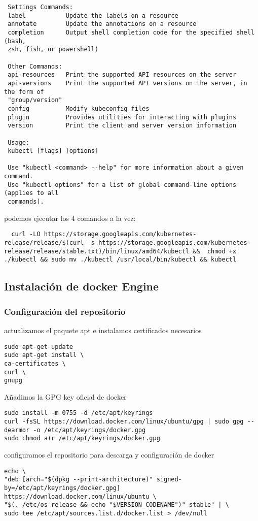 \documentclass[../main.tex]{subfiles}
\begin{document}
\begin{lstlisting}
 Settings Commands:
 label           Update the labels on a resource
 annotate        Update the annotations on a resource
 completion      Output shell completion code for the specified shell (bash,
 zsh, fish, or powershell)
 
 Other Commands:
 api-resources   Print the supported API resources on the server
 api-versions    Print the supported API versions on the server, in the form of
 "group/version"
 config          Modify kubeconfig files
 plugin          Provides utilities for interacting with plugins
 version         Print the client and server version information
 
 Usage:
 kubectl [flags] [options]
 
 Use "kubectl <command> --help" for more information about a given command.
 Use "kubectl options" for a list of global command-line options (applies to all
 commands).
 \end{lstlisting}
 
 podemos ejecutar los 4 comandos a la vez:
\begin{lstlisting} 
  curl -LO https://storage.googleapis.com/kubernetes-release/release/$(curl -s https://storage.googleapis.com/kubernetes-release/release/stable.txt)/bin/linux/amd64/kubectl &&  chmod +x ./kubectl && sudo mv ./kubectl /usr/local/bin/kubectl && kubectl
\end{lstlisting}
\subsection{Instalación de docker Engine}
\subsubsection{Configuración del repositorio} 
actualizamos el paquete apt e instalamos certificados necesarios
\begin{lstlisting} 
sudo apt-get update
sudo apt-get install \
ca-certificates \
curl \
gnupg
\end{lstlisting} 

Añadimos la GPG key oficial de docker
\begin{lstlisting}
sudo install -m 0755 -d /etc/apt/keyrings
curl -fsSL https://download.docker.com/linux/ubuntu/gpg | sudo gpg --dearmor -o /etc/apt/keyrings/docker.gpg
sudo chmod a+r /etc/apt/keyrings/docker.gpg
\end{lstlisting}

configuramos el repositorio para descarga y configuración de docker
\begin{lstlisting}
echo \
"deb [arch="$(dpkg --print-architecture)" signed-by=/etc/apt/keyrings/docker.gpg] https://download.docker.com/linux/ubuntu \
"$(. /etc/os-release && echo "$VERSION_CODENAME")" stable" | \
sudo tee /etc/apt/sources.list.d/docker.list > /dev/null 
\end{lstlisting}
\end{document}
